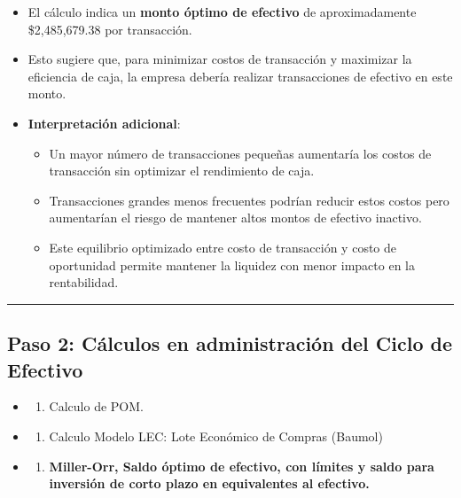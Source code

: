 \documentclass[
  letterpaper,
  DIV=11,
  numbers=noendperiod]{scrartcl}
\providecommand{\tightlist}{%
  \setlength{\itemsep}{0pt}\setlength{\parskip}{0pt}}\usepackage{longtable,booktabs,array}
\begin{document}
\begin{itemize}
\item
  El cálculo indica un \textbf{monto óptimo de efectivo} de
  aproximadamente \$2,485,679.38 por transacción.
\item
  Esto sugiere que, para minimizar costos de transacción y maximizar la
  eficiencia de caja, la empresa debería realizar transacciones de
  efectivo en este monto.
\item
  \textbf{Interpretación adicional}:

  \begin{itemize}
  \tightlist
  \item
    Un mayor número de transacciones pequeñas aumentaría los costos de
    transacción sin optimizar el rendimiento de caja.
  \item
    Transacciones grandes menos frecuentes podrían reducir estos costos
    pero aumentarían el riesgo de mantener altos montos de efectivo
    inactivo.
  \item
    Este equilibrio optimizado entre costo de transacción y costo de
    oportunidad permite mantener la liquidez con menor impacto en la
    rentabilidad.
  \end{itemize}
\end{itemize}

\begin{center}\rule{0.5\linewidth}{0.5pt}\end{center}

\subsection{Paso 2: Cálculos en administración del Ciclo de
Efectivo}\label{paso-2-cuxe1lculos-en-administraciuxf3n-del-ciclo-de-efectivo-2}

\begin{itemize}
\tightlist
\item
  \begin{enumerate}
  \def\labelenumi{\arabic{enumi}.}
  \tightlist
  \item
    Calculo de POM.
  \end{enumerate}
\item
  \begin{enumerate}
  \def\labelenumi{\arabic{enumi}.}
  \setcounter{enumi}{1}
  \tightlist
  \item
    Calculo Modelo LEC: Lote Económico de Compras (Baumol)
  \end{enumerate}
\item
  \begin{enumerate}
  \def\labelenumi{\arabic{enumi}.}
  \setcounter{enumi}{2}
  \tightlist
  \item
    \textbf{Miller-Orr, Saldo óptimo de efectivo, con límites y saldo
    para inversión de corto plazo en equivalentes al efectivo.}
  \end{enumerate}
\end{itemize}
\end{document}
